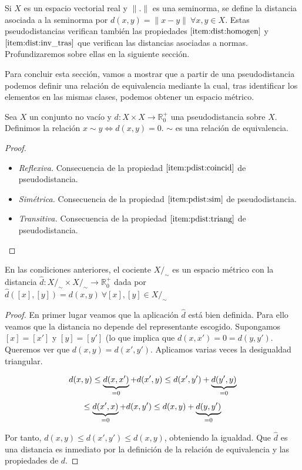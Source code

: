 \begin{example}
    Si $X$ es un espacio vectorial real y $\|.\|$ es una seminorma, se define la distancia asociada a la seminorma por $d(x,y)=\|x-y\| \ \forall x,y\in X$. Estas pseudodistancias verifican también las propiedades $\ref{item:dist:homogen}$ y $\ref{item:dist:inv_tras}$ que verifican las distancias asociadas a normas. Profundizaremos sobre ellas en la siguiente sección.
\end{example}

Para concluir esta sección, vamos a mostrar que a partir de una pseudodistancia podemos definir una relación de equivalencia mediante la cual, tras identificar los elementos en las mismas clases, podemos obtener un espacio métrico.

\begin{prop}
    Sea $X$ un conjunto no vacío y $d:X\times X \to \mathbb{R}^+_0$ una pseudodistancia sobre $X$. Definimos la relación $x \sim y \iff d(x,y)=0$. $\sim$ es una relación de equivalencia.
\end{prop}

\begin{proof}~
\begin{itemize}
    \item \emph{Reflexiva.} Consecuencia de la propiedad $\ref{item:pdist:coincid}$ de pseudodistancia.
    \item \emph{Simétrica.} Consecuencia de la propiedad $\ref{item:pdist:sim}$ de pseudodistancia.
    \item \emph{Transitiva.} Consecuencia de la propiedad $\ref{item:pdist:triang}$ de pseudodistancia.
\end{itemize}

\end{proof}

\begin{thm} \label{thm:quotient_dist}

En las condiciones anteriores, el cociente $X/_\sim$ es un espacio métrico con la distancia $\hat{d}:X/_\sim \times X/_\sim \to \mathbb{R}^+_0$ dada por $\hat{d}([x],[y])=d(x,y) \ \forall[x],[y] \in X/_\sim$

\end{thm}

\begin{proof}

En primer lugar veamos que la aplicación $\hat{d}$ está bien definida. Para ello veamos que la distancia no depende del representante escogido. Supongamos $[x]=[x']$ y $[y]=[y']$ (lo que implica que $d(x,x')=0=d(y,y')$. Queremos ver que $d(x,y)=d(x',y')$. Aplicamos varias veces la desigualdad triangular.

\[d(x,y)\le \underbrace{d(x,x')}_{=0}+d(x',y) \le d(x',y')+\underbrace{d(y',y)}_{=0}\]
\[\le \underbrace{d(x',x)}_{=0}+d(x,y') \le d(x,y) + \underbrace{d(y,y')}_{=0} \]

Por tanto, $d(x,y) \le d(x',y') \le d(x,y)$, obteniendo la igualdad. Que $\hat{d}$ es una distancia es inmediato por la definición de la relación de equivalencia y las propiedades de $d$.

\end{proof}

